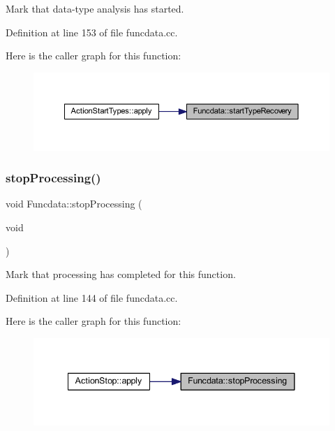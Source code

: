 Mark that data-\/type analysis has started. 



Definition at line 153 of file funcdata.\+cc.

Here is the caller graph for this function\+:
\nopagebreak
\begin{figure}[H]
\begin{center}
\leavevmode
\includegraphics[width=350pt]{class_funcdata_a0add0ec99a303d6cdfc5187bb2c768f7_icgraph}
\end{center}
\end{figure}
\mbox{\label{class_funcdata_a36b7bf9f9ad6a3c56968f4daa9ca27d5}} 
\subsubsection{\texorpdfstring{stopProcessing()}{stopProcessing()}}
{\footnotesize\ttfamily void Funcdata\+::stop\+Processing (\begin{DoxyParamCaption}\item[{void}]{ }\end{DoxyParamCaption})}



Mark that processing has completed for this function. 



Definition at line 144 of file funcdata.\+cc.

Here is the caller graph for this function\+:
\nopagebreak
\begin{figure}[H]
\begin{center}
\leavevmode
\includegraphics[width=341pt]{class_funcdata_a36b7bf9f9ad6a3c56968f4daa9ca27d5_icgraph}
\end{center}
\end{figure}
\mbox{\label{class_funcdata_a5ba1555023c49006ed39936b9a40aba4}} 
